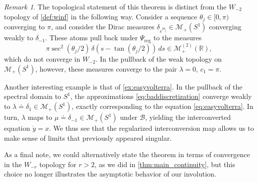 \documentclass{cams-l} %
\newcommand{\dave}[1]{#1}\newcommand{\davebegin}{}\newcommand{\daveend}{}\newcommand{\george}[1]{#1}
\newcommand{\RR}{\mathbb R}
\newcommand{\cM}{\mathcal M}
\newcommand{\cB}{\mathcal B}
\theoremstyle{definition}
\theoremstyle{remark}
\newtheorem{remark}[theorem]{Remark}
\numberwithin{equation}{section}
\begin{document}
\begin{remark}\label{rem:coolremark}
    The topological statement of this theorem is distinct from the $W_{-2}$ topology of \cref{def:winf} in the following way. Consider a sequence $\theta_j\in [0,\pi)$ converging to $\pi$, and consider the Dirac measures $\delta_{e^{i\theta_j}}\in\cM_+(S^1)$ converging weakly to $\delta_{-1}$. These atoms pull back under $\Psi_\mathrm{reg}$ to the measures
    \[\pi \sec^2(\theta_j/2)\,\delta\left(s - \tan(\theta_j/2)\right)\,ds\in\cM_+^{(2)}(\RR),\]
    which do not converge in $W_{-2}$. In the pullback of the weak topology on $\cM_+(S^1)$, however, these measures converge to the pair $\lambda=0$, $c_1=\pi$.

    Another interesting example is that of \cref{ex:easyvolterra}. In the pullback of the spectral domain to $S^1$, the approximations \cref{eq:baddiscretization} converge weakly to $\lambda\doteq\delta_1\in\cM_+(S^1)$, exactly corresponding to the equation \cref{eq:easyvolterra}. In turn, $\lambda$ maps to $\mu\doteq\delta_{-1}\in\cM_+(S^1)$ under $\cB$, yielding the interconverted equation $\dot{y} = x$. We thus see that the regularized interconversion map allows us to make sense of limits that \dave{previously appeared singular}.

    As a final note, we could alternatively state the theorem in terms of convergence in the $W_{-r}$ topology for $r>2$, as we did in \cref{thm:main_continuity}, but this choice no longer illustrates the asymptotic behavior of \dave{our involution}.
\end{remark}
\end{document}

